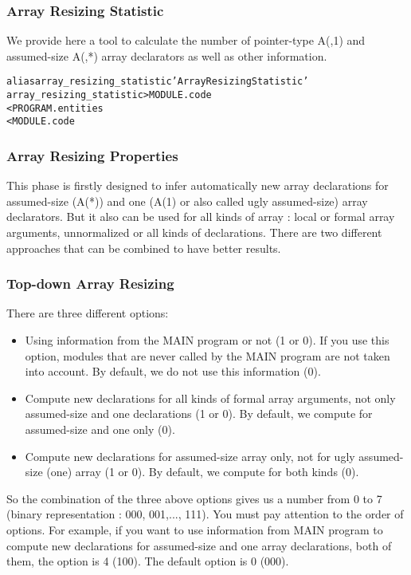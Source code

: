 \documentclass[a4paper]{report}
\newenvironment{PipsMake}{\begin{alltt}}{\end{alltt}}
\begin{document}
\subsubsection{Array Resizing Statistic}

We provide here a tool to calculate the number of pointer-type A(,1) and
assumed-size A(,*) array declarators as well as other information.

\begin{PipsMake}
alias array_resizing_statistic 'Array Resizing Statistic'
array_resizing_statistic   > MODULE.code
        < PROGRAM.entities
        < MODULE.code
\end{PipsMake}

\subsubsection{Array Resizing Properties}

This phase is firstly designed to infer automatically new array
declarations for assumed-size (A(*)) and one (A(1) or also called ugly
assumed-size) array declarators. But
it also can be used for all kinds of array : local or formal array
arguments, unnormalized or all kinds of declarations. There are two
different approaches that can be combined to have better results.

\subsubsection*{Top-down Array Resizing}
There are three different options:
\begin{itemize}
\item Using information from the MAIN program or not (1 or 0). If you use
  this option, modules that are never called by the MAIN program are not
  taken into account. By default, we do not use this information (0).
\item Compute new declarations for all kinds of formal array arguments,
  not only assumed-size and one declarations (1 or 0). By default, we
  compute for assumed-size and one only (0).
\item Compute new declarations for assumed-size array only, not for ugly
  assumed-size (one) array (1 or 0). By default, we compute for both kinds
  (0).
\end{itemize}
So the combination of the three above options gives us a number from 0 to
7 (binary representation : 000, 001,..., 111). You must pay attention to
the order of options. For example, if you want to use information from
MAIN program to compute new declarations for assumed-size and one array
declarations, both of them, the option is 4 (100). The default option is 0
(000).
\end{document}
